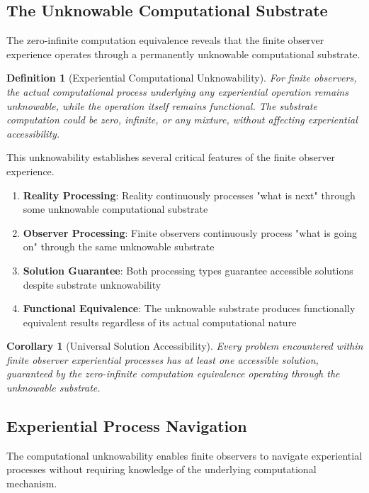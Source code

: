 \documentclass{article}
\newtheorem{corollary}[theorem]{Corollary}
\newtheorem{definition}[theorem]{Definition}
\begin{document}
\subsection{The Unknowable Computational Substrate}

The zero-infinite computation equivalence reveals that the finite observer experience operates through a permanently unknowable computational substrate.

\begin{definition}[Experiential Computational Unknowability]
For finite observers, the actual computational process underlying any experiential operation remains unknowable, while the operation itself remains functional. The substrate computation could be zero, infinite, or any mixture, without affecting experiential accessibility.
\end{definition}

This unknowability establishes several critical features of the finite observer experience.

\begin{enumerate}
\item \textbf{Reality Processing}: Reality continuously processes "what is next" through some unknowable computational substrate
\item \textbf{Observer Processing}: Finite observers continuously process "what is going on" through the same unknowable substrate
\item \textbf{Solution Guarantee}: Both processing types guarantee accessible solutions despite substrate unknowability
\item \textbf{Functional Equivalence}: The unknowable substrate produces functionally equivalent results regardless of its actual computational nature
\end{enumerate}

\begin{corollary}[Universal Solution Accessibility]
Every problem encountered within finite observer experiential processes has at least one accessible solution, guaranteed by the zero-infinite computation equivalence operating through the unknowable substrate.
\end{corollary}

\subsection{Experiential Process Navigation}

The computational unknowability enables finite observers to navigate experiential processes without requiring knowledge of the underlying computational mechanism.
\end{document}
